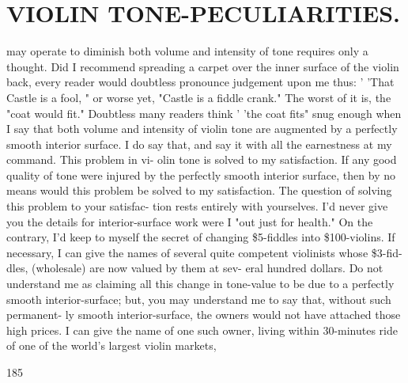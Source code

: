 \documentclass{article}
\begin{document}
\section*{VIOLIN TONE-PECULIARITIES.}
may operate to diminish both volume and intensity of tone requires only a thought. Did I recommend spreading a carpet over the inner surface of the violin back, every reader would doubtless pronounce judgement upon me thus: ' 'That Castle is a fool, " or worse yet, "Castle is a fiddle crank." The worst of it is, the "coat would fit." Doubtless many readers think ' 'the coat fits" snug enough when I say that both volume and intensity of violin tone are augmented by a perfectly smooth interior surface. I do say that, and say it with all the earnestness at my command. This problem in vi- olin tone is solved to my satisfaction. If any good quality of tone were injured by the perfectly smooth interior surface, then by no means would this problem be solved to my satisfaction. The question of solving this problem to your satisfac- tion rests entirely with yourselves. I'd never give you the details for interior-surface work were I "out just for health." On the contrary, I'd keep to myself the secret of changing \$5-fiddles into \$100-violins. If necessary, I can give the names of several quite competent violinists whose \$3-fid- dles, (wholesale) are now valued by them at sev- eral hundred dollars. Do not understand me as claiming all this change in tone-value to be due to a perfectly smooth interior-surface; but, you may understand me to say that, without such permanent- ly smooth interior-surface, the owners would not have attached those high prices. I can give the name of one such owner, living within 30-minutes ride of one of the world's largest violin markets,

185
\end{document}
